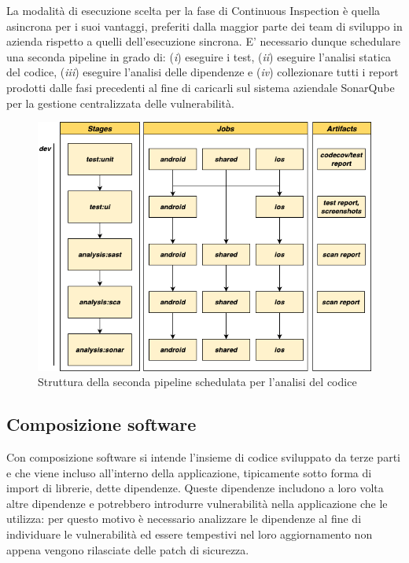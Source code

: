 La modalità di esecuzione scelta per la fase di Continuous Inspection è quella asincrona per i suoi vantaggi, preferiti dalla maggior parte dei team di sviluppo in azienda rispetto a quelli dell'esecuzione sincrona. E' necessario dunque schedulare una seconda pipeline in grado di: (\textit{i}) eseguire i test, (\textit{ii}) eseguire l'analisi statica del codice, (\textit{iii}) eseguire l'analisi delle dipendenze e (\textit{iv}) collezionare tutti i report prodotti dalle fasi precedenti al fine di caricarli sul sistema aziendale SonarQube per la gestione centralizzata delle vulnerabilità.

\begin{figure}[H]
    \centering
    \includegraphics[width=1\textwidth]{img/inspection-pipeline.png}
    \caption{Struttura della seconda pipeline schedulata per l'analisi del codice}
\end{figure}

\subsection{Composizione software}
Con composizione software si intende l'insieme di codice sviluppato da terze parti e che viene incluso all'interno della applicazione, tipicamente sotto forma di import di librerie, dette dipendenze. Queste dipendenze includono a loro volta altre dipendenze e potrebbero introdurre vulnerabilità nella applicazione che le utilizza: per questo motivo è necessario analizzare le dipendenze al fine di individuare le vulnerabilità ed essere tempestivi nel loro aggiornamento non appena vengono rilasciate delle patch di sicurezza. 

